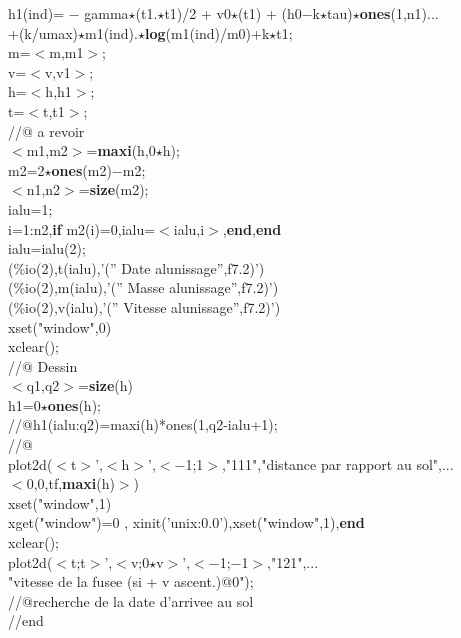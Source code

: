{\begin{flushleft}
{\cmarg h1(ind)= $-$ gamma$\star$(t1.$\star$t1)/2 +  v0$\star$(t1) + (h0$-$k$\star$tau)$\star${\bf ones}(1,n1)...\\ 
\cmarg \hspace{1.5cm}+(k/umax)$\star$m1(ind).$\star${\bf log}(m1(ind)/m0)+k$\star$t1;\\ 
\cmarg m=$<$m,m1$>$;\\ 
\cmarg v=$<$v,v1$>$;\\ 
\cmarg h=$<$h,h1$>$;\\ 
\cmarg t=$<$t,t1$>$;\\ 
\cmarg \verb@//@ a revoir \\ 
\cmarg $<$m1,m2$>$={\bf maxi}(h,0$\star$h);\\ 
\cmarg m2=2$\star${\bf ones}(m2)$-$m2;\\ 
\cmarg $<$n1,n2$>$={\bf size}(m2);\\ 
\cmarg ialu=1;\\ 
 i=1:n2,{\bf if} m2(i)=0,ialu=$<$ialu,i$>$,{\bf end},{\bf end}\\ 
\cmarg ialu=ialu(2);\\ 
(\%io(2),t(ialu),'('' Date alunissage'',f7.2)')\\ 
(\%io(2),m(ialu),'('' Masse  alunissage'',f7.2)')\\ 
(\%io(2),v(ialu),'('' Vitesse alunissage'',f7.2)')\\ 
\cmarg xset("window",0)\\ 
\cmarg xclear();\\ 
\cmarg \verb@//@ Dessin \\ 
\cmarg $<$q1,q2$>$={\bf size}(h)\\ 
\cmarg h1=0$\star${\bf ones}(h);\\ 
\cmarg \verb@//@h1(ialu:q2)=maxi(h)*ones(1,q2-ialu+1);\\ 
\cmarg \verb@//@\\ 
\cmarg plot2d($<$t$>$',$<$h$>$',$<$$-$1;1$>$,"111","distance par rapport au sol",...\\ 
\cmarg \hspace{1.0cm}$<$0,0,tf,{\bf maxi}(h)$>$)\\ 
\cmarg xset("window",1)\\ 
 xget("window")=0 , xinit('unix:0.0'),xset("window",1),{\bf end}\\ 
\cmarg xclear();\\ 
\cmarg plot2d($<$t;t$>$',$<$v;0$\star$v$>$',$<$$-$1;$-$1$>$,"121",...\\ 
\cmarg \hspace{1.8cm}"vitesse de la fusee (si + v ascent.)@0");\\ 
\cmarg \verb@//@recherche de la date d'arrivee au sol \\ 
\cmarg //end}
\end{flushleft}}



